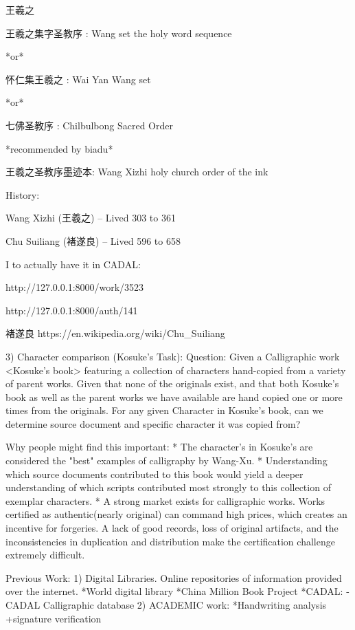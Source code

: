 王羲之

王羲之集字圣教序 : Wang set the holy word sequence

*or*

怀仁集王羲之 : Wai Yan Wang set

*or*

七佛圣教序 : Chilbulbong Sacred Order

*recommended by biadu*

王羲之圣教序墨迹本: Wang Xizhi holy church order of the ink


History:

Wang Xizhi (王羲之) -- Lived 303 to 361

Chu Suiliang (褚遂良) -- Lived 596 to 658







I to actually have it in CADAL:

http://127.0.0.1:8000/work/3523

http://127.0.0.1:8000/auth/141

褚遂良
https://en.wikipedia.org/wiki/Chu_Suiliang



3)  Character comparison (Kosuke's Task):
    Question:   Given a Calligraphic work <Kosuke's book> featuring a collection of characters hand-copied from a variety of parent works.
                Given that none of the originals exist, and that both Kosuke's book as well as the parent works we have available are hand copied one or more times from the originals.
                For any given Character in Kosuke's book, can we determine source document and specific character it was copied from?
                
Why people might find this important:
    *  The character's in Kosuke's are considered the "best" examples of calligraphy by Wang-Xu.
    *  Understanding which source documents contributed to this book would yield a deeper understanding of which scripts contributed most strongly to this collection of exemplar characters.
    *  A strong market exists for calligraphic works.  Works certified as authentic(nearly original) can command high prices, which creates an incentive for forgeries.  A lack of good records, loss of original artifacts, and the inconsistencies in duplication and distribution make the certification challenge extremely difficult.
    
Previous Work:
    1) Digital Libraries.  Online repositories of information provided over the internet.
        *World digital library
        *China Million Book Project
            *CADAL:
                -CADAL Calligraphic database
    2) ACADEMIC work:
        *Handwriting analysis
            +signature verification
            

